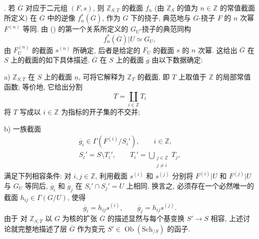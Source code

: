 

\medskip
\noindent {}. 若 $\overline G$ 对应于二元组 $(F,s)$, 则 $\mathbb Z_{S,T}$ 的截面 $f_n$ (由 $\mathbb Z_S$ 的值为 $n\in\mathbb Z$ 的常值截面所定义) 在 $\overline G$ 中的逆像 $f_n^*(\overline G)$, 作为 $G$ 下的挠子, 典范地与 $G$-挠子 $F$ 的 $n$ 次幂 $F^{(n)}$ 等同. 由 () 的第一个关系所定义的 $G_U$-挠子的典范同构
\[
 f_n^*(\overline G)|U\simeq G_U,
\]
由 $F_U^{(n)}$ 的截面 $s^{(n)}$ 所确定, 后者是给定的 $F_U$ 的截面 $s$ 的 $n$ 次幂. 这给出 $\overline G$ 在 $S$ 上的截面的如下具体描述. $\overline G$ 在 $S$ 上的截面 $\overline g$ 由以下数据确定:

\smallskip
\noindent a) $\mathbb Z_{S,T}$ 在 $S$ 上的截面 $\underline n$, 可将它解释为 $\mathbb Z_T$ 的截面, 即 $T$ 上取值于 $\mathbb Z$ 的局部常值函数; 等价地, 它给出分割
\[
 T=\coprod_{i\in\mathbb Z}T_i
\]
将 $T$ 写成以 $i\in\mathbb Z$ 为指标的开子集的不交并;

\smallskip
\noindent b) 一族截面
\[
 \begin{gathered}
  \overline g_i\in\Gamma(F^{(i)}/S_i'),\qquad i\in\mathbb Z,\\
  S_i'=S\setminus T_i',\qquad
  T_i'=\displaystyle\bigcup_{\substack{j\in\mathbb Z\\j\ne i}}T_j,
 \end{gathered}
\]
满足下列相容条件: 对 $i,j\in\mathbb Z$, 利用截面 $s^{(i)}$ 和 $s^{(j)}$ 分别将 $F^{(i)}|U$ 和 $F^{(j)}|U$ 与 $G_U$ 等同后, $\overline g_i$ 和 $\overline g_j$ 在 $S_i'\cap S_j'=U$ 上相同. 换言之, 必须存在一个必然唯一的截面 $h_{ij}\in\Gamma(G/U)$, 使得
\[
 \overline g_i=h_{ij}s^{(i)},\qquad
 \overline g_j=h_{ij}s^{(j)}.
\]
由于  对 $\mathbb Z_{S,T}$ 以 $G$ 为核的扩张 $\overline G$ 的描述显然与每个基变换 $S'\to S$ 相容, 上述讨论就完整地描述了层 $\overline G$ 作为变元 $S'\in\operatorname{Ob}(\mathrm{Sch}_{/S})$ 的函子.

